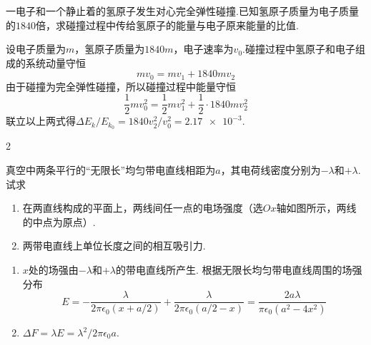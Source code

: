 \begin{problem} %
    一电子和一个静止着的氢原子发生对心完全弹性碰撞.已知氢原子质量为电子质量的$1840$倍，求碰撞过程中传给氢原子的能量与电子原来能量的比值.
\end{problem}
\begin{solution}
    设电子质量为$m$，氢原子质量为$1840m$，电子速率为$v_0$.碰撞过程中氢原子和电子组成的系统动量守恒
    \[mv_0=mv_1+1840mv_2\]
    由于碰撞为完全弹性碰撞，所以碰撞过程中能量守恒
    \[\frac12mv_0^2=\frac12mv_1^2+\frac12\cdot 1840 mv_2^2\]
    联立以上两式得$\Delta E_k/E_{k_0}=1840v_2^2/v_0^2=\num{2.17e-3}$.
\end{solution}

\begin{paracol}{2}
\begin{problem} %
    真空中两条平行的``无限长''均匀带电直线相距为$a$，其电荷线密度分别为$-\lambda$和$+\lambda$. 试求
    \begin{enumerate}
        \item 在两直线构成的平面上，两线间任一点的电场强度（选$Ox$轴如图所示，两线的中点为原点）.
        \item 两带电直线上单位长度之间的相互吸引力.
    \end{enumerate}
\end{problem}
\switchcolumn\centering
\vfill
{}
\vfill
\end{paracol}
\begin{solution}\leavevmode
    \begin{enumerate}
        \item $x$处的场强由$-\lambda$和$+\lambda$的带电直线所产生. 根据无限长均匀带电直线周围的场强分布
        \[E=-\frac{\lambda}{2\pi\epsilon_0(x+a/2)}+\frac{\lambda}{2\pi\epsilon_0(a/2-x)}=\frac{2a\lambda}{\pi\epsilon_0(a^2-4x^2)}\]
        \item $\Delta F=\lambda E=\lambda^2/2\pi\epsilon_0a$.
    \end{enumerate}
\end{solution}

